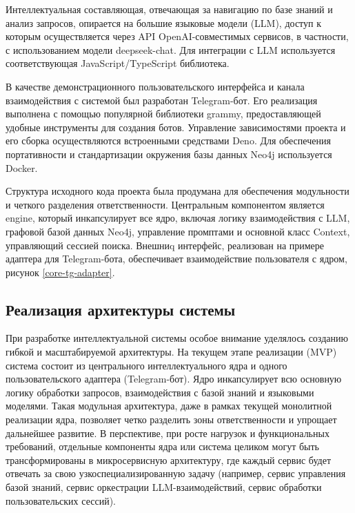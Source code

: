 Интеллектуальная составляющая, отвечающая за навигацию по базе знаний и анализ запросов, опирается на большие языковые модели (LLM), доступ к которым осуществляется через API OpenAI-совместимых сервисов, в частности, с использованием модели deepseek-chat. Для интеграции с LLM используется соответствующая JavaScript/TypeScript библиотека.

В качестве демонстрационного пользовательского интерфейса и канала взаимодействия с системой был разработан Telegram-бот. Его реализация выполнена с помощью популярной библиотеки grammy, предоставляющей удобные инструменты для создания ботов. Управление зависимостями проекта и его сборка осуществляются встроенными средствами Deno. Для обеспечения портативности и стандартизации окружения базы данных Neo4j используется Docker.


Структура исходного кода проекта была продумана для обеспечения модульности и четкого разделения ответственности. Центральным компонентом является engine, который инкапсулирует все ядро, включая логику взаимодействия с LLM, графовой базой данных Neo4j, управление промптами и основной класс Context, управляющий сессией поиска. Внешниq интерфейс, реализован на примере адаптера для Telegram-бота, обеспечивает взаимодействие пользователя с ядром, рисунок \ref{core-tg-adapter}. 


\subsection{Реализация архитектуры системы}

При разработке интеллектуальной системы особое внимание уделялось созданию гибкой и масштабируемой архитектуры. На текущем этапе реализации (MVP) система состоит из центрального интеллектуального ядра и одного пользовательского адаптера (Telegram-бот). Ядро инкапсулирует всю основную логику обработки запросов, взаимодействия с базой знаний и языковыми моделями. Такая модульная архитектура, даже в рамках текущей монолитной реализации ядра, позволяет четко разделить зоны ответственности и упрощает дальнейшее развитие. В перспективе, при росте нагрузок и функциональных требований, отдельные компоненты ядра или система целиком могут быть трансформированы в микросервисную архитектуру, где каждый сервис будет отвечать за свою узкоспециализированную задачу (например, сервис управления базой знаний, сервис оркестрации LLM-взаимодействий, сервис обработки пользовательских сессий).

